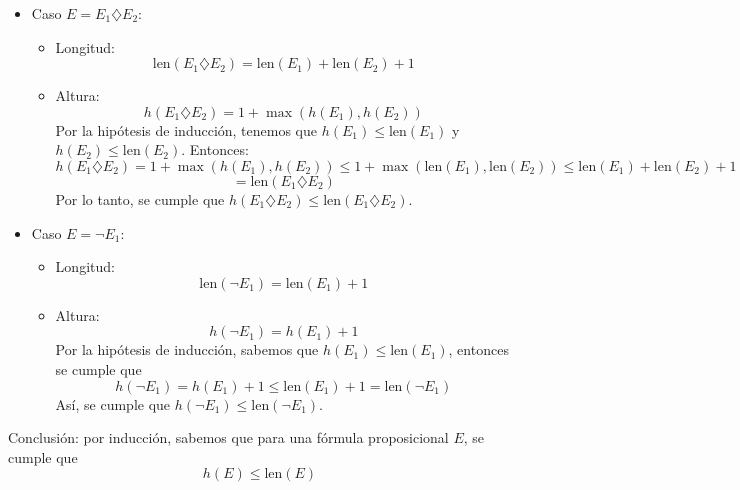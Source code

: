 \begin{enumerate}
    \begin{itemize}
        \item Caso $E = E_1 \diamondsuit E_2$:
        \begin{itemize}
            \item[]  Longitud:
            \[
            \text{len}(E_1 \diamondsuit E_2) = \text{len}(E_1) + \text{len}(E_2) + 1
            \]
            \item[] Altura:
            \[
            h(E_1 \diamondsuit E_2) = 1 + \max(h(E_1), h(E_2))
            \]
            Por la hipótesis de inducción, tenemos que $h(E_1) \leq \text{len}(E_1)$ y $h(E_2) \leq \text{len}(E_2)$. Entonces:
            \[
            h(E_1 \diamondsuit E_2) = 1 + \max(h(E_1), h(E_2)) \leq 1 + \max(\text{len}(E_1), \text{len}(E_2)) \leq \text{len}(E_1) + \text{len}(E_2) + 1
            \]
            \[
            = \text{len}(E_1 \diamondsuit E_2)
            \]
            Por lo tanto, se cumple que $h(E_1 \diamondsuit E_2) \leq \text{len}(E_1 \diamondsuit E_2)$.
        \end{itemize}
        \item Caso $E = \neg E_1$:
        \begin{itemize}
            \item []Longitud:
            \[
            \text{len}(\neg E_1) = \text{len}(E_1) + 1
            \]
            \item[] Altura:
            \[
            h(\neg E_1) = h(E_1) + 1
            \]
            Por la hipótesis de inducción, sabemos que $h(E_1) \leq \text{len}(E_1)$, entonces se cumple que
            \[
            h(\neg E_1) = h(E_1) + 1 \leq \text{len}(E_1) + 1 = \text{len}(\neg E_1)
            \]
            Así, se cumple que $h(\neg E_1) \leq \text{len}(\neg E_1)$.
        \end{itemize}
    \end{itemize}
\end{enumerate}

Conclusión: por inducción, sabemos que para una fórmula proposicional $E$, se cumple que
\[
h(E) \leq \text{len}(E)
\]